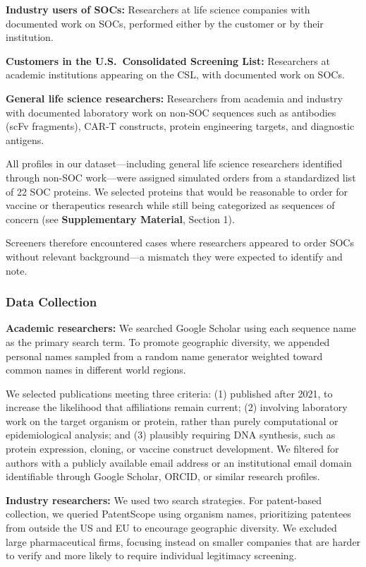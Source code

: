 \documentclass[utf8]{FrontiersinHarvard}
\begin{document}
\textbf{Industry users of SOCs:} Researchers at life science companies with documented work on SOCs, performed either by the customer or by their institution.

\textbf{Customers in the U.S.\ Consolidated Screening List:} Researchers at academic institutions appearing on the CSL, with documented work on SOCs.

\textbf{General life science researchers:} Researchers from academia and industry with documented laboratory work on non-SOC sequences such as antibodies (scFv fragments), CAR-T constructs, protein engineering targets, and diagnostic antigens.

All profiles in our dataset---including general life science researchers identified through non-SOC work---were assigned simulated orders from a standardized list of 22 SOC proteins. We selected proteins that would be reasonable to order for vaccine or therapeutics research while still being categorized as sequences of concern (see \textbf{Supplementary Material}, Section 1).

Screeners therefore encountered cases where researchers appeared to order SOCs without relevant background---a mismatch they were expected to identify and note.

\subsubsection{Data Collection}

\textbf{Academic researchers:} We searched Google Scholar using each sequence name as the primary search term. To promote geographic diversity, we appended personal names sampled from a random name generator weighted toward common names in different world regions.

We selected publications meeting three criteria: (1) published after 2021, to increase the likelihood that affiliations remain current; (2) involving laboratory work on the target organism or protein, rather than purely computational or epidemiological analysis; and (3) plausibly requiring DNA synthesis, such as protein expression, cloning, or vaccine construct development. We filtered for authors with a publicly available email address or an institutional email domain identifiable through Google Scholar, ORCID, or similar research profiles.

\textbf{Industry researchers:} We used two search strategies. For patent-based collection, we queried PatentScope using organism names, prioritizing patentees from outside the US and EU to encourage geographic diversity. We excluded large pharmaceutical firms, focusing instead on smaller companies that are harder to verify and more likely to require individual legitimacy screening.
\end{document}

